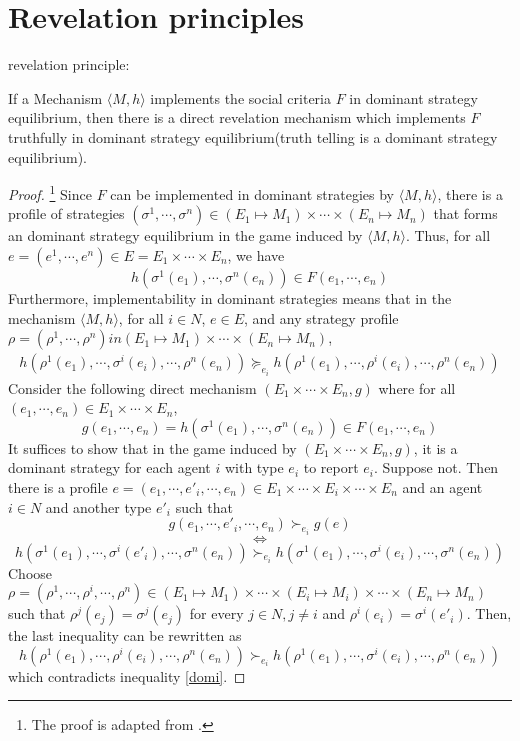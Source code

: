 
\chapter{Revelation principles} %

\label{Appendix_A} %

\begin{thm*}
revelation principle:

If a Mechanism $\langle M, h\rangle$ implements the social criteria 
$F$ in dominant strategy
equilibrium, then there is a direct revelation mechanism which
implements $F$ truthfully in dominant strategy equilibrium(truth
telling is a dominant strategy equilibrium). 

\end{thm*}
\begin{proof}
  \footnote{The proof is adapted from \parencite{Vohra2011}.}
 Since $F$ can be implemented in dominant strategies by  $\langle M, h\rangle$, there is a profile of strategies $(\sigma^1,\cdots,
 \sigma^n)\in (E_1\mapsto M_1)\times \cdots\times (E_n\mapsto M_n)$
 that forms an dominant strategy  equilibrium in the game induced by $\langle M, h\rangle$. Thus, for
 all $e=(e^1, \cdots,e^n)\in E=E_1\times \cdots\times E_n$, we have
 $$h(\sigma^1(e_1),\cdots,\sigma^n(e_n))\in F(e_1,\cdots,e_n)$$
 Furthermore, implementability in dominant strategies means that  in
 the mechanism $\langle M, h\rangle$, for
 all $i\in N$, $e\in E$, and any  strategy profile
 $\rho=(\rho^1,\cdots,\rho^n) in (E_1\mapsto M_1)\times \cdots\times (E_n\mapsto M_n)$,
 \begin{align}\label{domi}
 h(\rho^1(e_1),\cdots,\sigma^i(e_i),\cdots,\rho^n(e_n)) \succeq_{e_i} h(\rho^1(e_1),\cdots,\rho^i(e_i),\cdots,\rho^n(e_n))
 \end{align}
Consider the following direct mechanism $(E_1\times\cdots\times E_n, g)$ where for all $(e_1,\cdots,e_n)\in E_1\times\cdots\times E_n$,
$$g(e_1,\cdots,e_n)=h(\sigma^1(e_1),\cdots,\sigma^n(e_n))\in F(e_1,\cdots,e_n)$$
It suffices to show that in the game induced by
$(E_1\times\cdots\times E_n, g)$, it is a dominant strategy  for each agent 
$i$ with type $e_i$ to report $e_i$. Suppose not. Then there is a
profile $e=(e_1,\cdots, e'_i, \cdots, e_n)\in E_1\times\cdots \times
E_i \times \cdots \times E_n$ and an
agent $i\in N$ and another type $e'_i$ such that
$$g(e_1, \cdots, e'_i, \cdots, e_n) \succ_{e_i} g(e)$$
$$\Longleftrightarrow$$
$$h(\sigma^1(e_1),\cdots,\sigma^i(e'_i),\cdots,\sigma^n(e_n))\succ_{e_i} h(\sigma^1(e_1),\cdots,\sigma^i(e_i),\cdots,\sigma^n(e_n))$$
Choose  $\rho=(\rho^1,\cdots,\rho^i,\cdots,
 \rho^n)\in (E_1\mapsto M_1)\times \cdots\times (E_i\mapsto M_i)
 \times \cdots\times (E_n\mapsto M_n)$ such that
 $\rho^j(e_j)=\sigma^j(e_j)$ for every $j \in N, j\not = i$ and $\rho^i(e_i)=\sigma^i(e'_i)$. Then, the last inequality can be rewritten as
$$h(\rho^1(e_1),\cdots,\rho^i(e_i),\cdots,\rho^n(e_n))\succ_{e_i}h(\rho^1(e_1),\cdots,\sigma^i(e_i),\cdots,\rho^n(e_n))$$
which contradicts inequality \ref{domi}.
 \end{proof}

